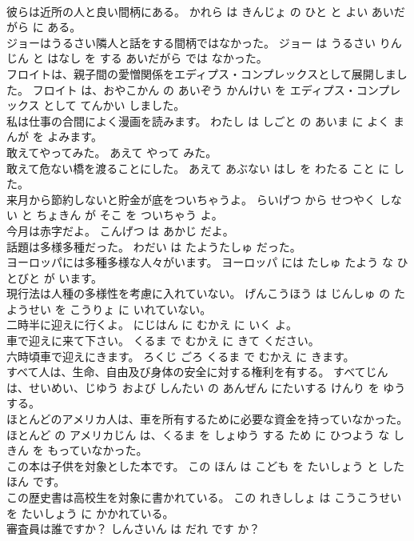 \documentclass[8pt]{extreport}
\begin{document}
\begin{CJK}{UTF8}{min}
\\	彼らは近所の人と良い間柄にある。	かれら は きんじょ の ひと と よい あいだがら に ある。	
\\	ジョーはうるさい隣人と話をする間柄ではなかった。	ジョー は うるさい りんじん と はなし を する あいだがら では なかった。	
\\	フロイトは、親子間の愛憎関係をエディプス・コンプレックスとして展開しました。	フロイト は、おやこかん の あいぞう かんけい を エディプス・コンプレックス として てんかい しました。	
\\	私は仕事の合間によく漫画を読みます。	わたし は しごと の あいま に よく まんが を よみます。	
\\	敢えてやってみた。	あえて やって みた。	
\\	敢えて危ない橋を渡ることにした。	あえて あぶない はし を わたる こと に した。	
\\	来月から節約しないと貯金が底をついちゃうよ。	らいげつ から せつやく しない と ちょきん が そこ を ついちゃう よ。	
\\	今月は赤字だよ。	こんげつ は あかじ だよ。	
\\	話題は多様多種だった。	わだい は たようたしゅ だった。	
\\	ヨーロッパには多種多様な人々がいます。	ヨーロッパ には たしゅ たよう な ひとびと が います。	
\\	現行法は人種の多様性を考慮に入れていない。	げんこうほう は じんしゅ の たようせい を こうりょ に いれていない。	
\\	二時半に迎えに行くよ。	にじはん に むかえ に いく よ。	
\\	車で迎えに来て下さい。	くるま で むかえ に きて ください。	
\\	六時頃車で迎えにきます。	ろくじ ごろ くるま で むかえ に きます。	
\\	すべて人は、生命、自由及び身体の安全に対する権利を有する。	すべてじん は、せいめい、じゆう および しんたい の あんぜん にたいする けんり を ゆうする。	
\\	ほとんどのアメリカ人は、車を所有するために必要な資金を持っていなかった。	ほとんど の アメリカじん は、くるま を しょゆう する ため に ひつよう な しきん を もっていなかった。	
\\	この本は子供を対象とした本です。	この ほん は こども を たいしょう と した ほん です。	
\\	この歴史書は高校生を対象に書かれている。	この れきししょ は こうこうせい を たいしょう に かかれている。	
\\	審査員は誰ですか？	しんさいん は だれ です か？	

\end{CJK}
\end{document}
